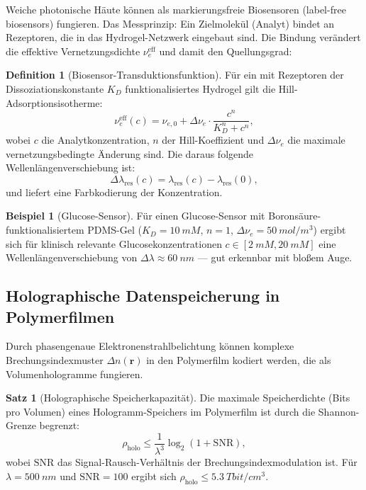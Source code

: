 ﻿\documentclass[a4paper,12pt]{article}
\theoremstyle{definition}
\newtheorem{definition}{Definition}[section]
\newtheorem{beispiel}{Beispiel}[section]
\newtheorem{satz}{Satz}[section]
\newcommand{\vect}[1]{\bm{#1}}
\begin{document}
	Weiche photonische Häute können als markierungsfreie Biosensoren
	(label-free biosensors) fungieren. Das Messprinzip: Ein Zielmolekül
	(Analyt) bindet an Rezeptoren, die in das Hydrogel-Netzwerk eingebaut sind.
	Die Bindung verändert die effektive Vernetzungsdichte $\nu_e^\mathrm{eff}$
	und damit den Quellungsgrad:
	
	\begin{definition}[Biosensor-Transduktionsfunktion]
		\label{def:biosensor}
		Für ein mit Rezeptoren der Dissoziationskonstante $K_D$ funktionalisiertes
		Hydrogel gilt die Hill-Adsorptionsisotherme:
		\begin{equation}
			\nu_e^\mathrm{eff}(c) = \nu_{e,0} + \Delta\nu_e \cdot \frac{c^n}{K_D^n + c^n},
			\label{eq:hill}
		\end{equation}
		wobei $c$ die Analytkonzentration, $n$ der Hill-Koeffizient und
		$\Delta\nu_e$ die maximale vernetzungsbedingte Änderung sind.
		Die daraus folgende Wellenlängenverschiebung ist:
		\begin{equation}
			\Delta\lambda_\mathrm{res}(c) = \lambda_\mathrm{res}(c) - \lambda_\mathrm{res}(0),
			\label{eq:wellenlaengenverschiebung}
		\end{equation}
		und liefert eine Farbkodierung der Konzentration.
	\end{definition}
	
	\begin{beispiel}[Glucose-Sensor]
		Für einen Glucose-Sensor mit Boronsäure-funktionalisiertem PDMS-Gel
		($K_D = \SI{10}{mM}$, $n = 1$, $\Delta\nu_e = \SI{50}{mol/m^3}$)
		ergibt sich für klinisch relevante Glucosekonzentrationen
		$c \in [\SI{2}{mM}, \SI{20}{mM}]$ eine Wellenlängenverschiebung von
		$\Delta\lambda \approx \SI{60}{nm}$ --- gut erkennbar mit bloßem Auge.
	\end{beispiel}
	
	\subsection{Holographische Datenspeicherung in Polymerfilmen}
	
	Durch phasengenaue Elektronenstrahlbelichtung können komplexe
	Brechungsindexmuster $\Delta n(\vect{r})$ in den Polymerfilm kodiert werden,
	die als Volumenhologramme fungieren.
	
	\begin{satz}[Holographische Speicherkapazität]
		\label{satz:holographie}
		Die maximale Speicherdichte (Bits pro Volumen) eines Hologramm-Speichers
		im Polymerfilm ist durch die Shannon-Grenze begrenzt:
		\begin{equation}
			\rho_\mathrm{holo} \leq \frac{1}{\lambda^3} \log_2(1 + \mathrm{SNR}),
			\label{eq:holo-kapazitaet}
		\end{equation}
		wobei $\mathrm{SNR}$ das Signal-Rausch-Verhältnis der Brechungsindexmodulation ist.
		Für $\lambda = \SI{500}{nm}$ und $\mathrm{SNR} = 100$ ergibt sich
		$\rho_\mathrm{holo} \leq \SI{5.3}{Tbit/cm^3}$.
	\end{satz}
	
\end{document}
